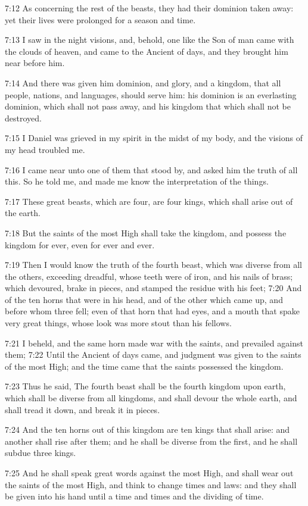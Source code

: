 7:12 As concerning the rest of the beasts, they had their dominion
taken away: yet their lives were prolonged for a season and time.

7:13 I saw in the night visions, and, behold, one like the Son of man
came with the clouds of heaven, and came to the Ancient of days, and
they brought him near before him.

7:14 And there was given him dominion, and glory, and a kingdom, that
all people, nations, and languages, should serve him: his dominion is
an everlasting dominion, which shall not pass away, and his kingdom
that which shall not be destroyed.

7:15 I Daniel was grieved in my spirit in the midst of my body, and
the visions of my head troubled me.

7:16 I came near unto one of them that stood by, and asked him the
truth of all this. So he told me, and made me know the interpretation
of the things.

7:17 These great beasts, which are four, are four kings, which shall
arise out of the earth.

7:18 But the saints of the most High shall take the kingdom, and
possess the kingdom for ever, even for ever and ever.

7:19 Then I would know the truth of the fourth beast, which was
diverse from all the others, exceeding dreadful, whose teeth were of
iron, and his nails of brass; which devoured, brake in pieces, and
stamped the residue with his feet; 7:20 And of the ten horns that were
in his head, and of the other which came up, and before whom three
fell; even of that horn that had eyes, and a mouth that spake very
great things, whose look was more stout than his fellows.

7:21 I beheld, and the same horn made war with the saints, and
prevailed against them; 7:22 Until the Ancient of days came, and
judgment was given to the saints of the most High; and the time came
that the saints possessed the kingdom.

7:23 Thus he said, The fourth beast shall be the fourth kingdom upon
earth, which shall be diverse from all kingdoms, and shall devour the
whole earth, and shall tread it down, and break it in pieces.

7:24 And the ten horns out of this kingdom are ten kings that shall
arise: and another shall rise after them; and he shall be diverse from
the first, and he shall subdue three kings.

7:25 And he shall speak great words against the most High, and shall
wear out the saints of the most High, and think to change times and
laws: and they shall be given into his hand until a time and times and
the dividing of time.

